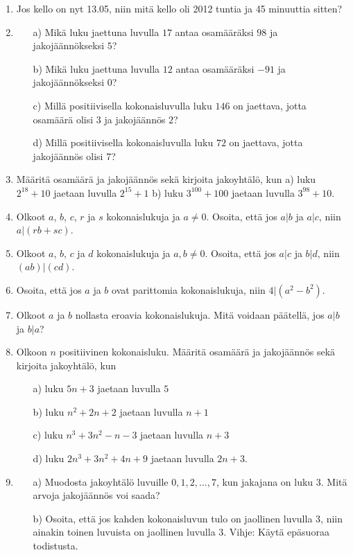 \begin{enumerate}
\item 
Jos kello on nyt 13.05, niin mitä kello oli 2012 tuntia ja 45 minuuttia sitten?

\item 
\begin{itemize}
\item[a)] Mikä luku jaettuna luvulla $17$ antaa osamääräksi $98$ ja jakojäännökseksi $5$?
\item[b)] Mikä luku jaettuna luvulla $12$ antaa osamääräksi $-91$ ja jakojäännökseksi $0$?
\item[c)] Millä positiivisella kokonaisluvulla luku $146$ on jaettava, jotta osamäärä olisi $3$ ja jakojäännös $2$?
\item[d)] Millä positiivisella kokonaisluvulla luku $72$ on jaettava, jotta jakojäännös olisi 7?
\end{itemize}

\item Määritä osamäärä ja jakojäännös sekä kirjoita jakoyhtälö, kun a) luku $2^{18} + 10$ jaetaan luvulla $2^{15} + 1$ b) luku $3^{100} + 100$ jaetaan luvulla $3^{98} + 10$.

\item Olkoot $a$, $b$, $c$, $r$ ja $s$ kokonaislukuja ja $a \neq 0$. Osoita, että jos $a|b$ ja $a|c$, niin $a|(rb + sc)$.

\item Olkoot $a$, $b$, $c$ ja $d$ kokonaislukuja ja $a,b \neq 0$. Osoita, että jos $a|c$ ja $b|d$, niin $(ab)|(cd)$.

\item Osoita, että jos $a$ ja $b$ ovat parittomia kokonaislukuja, niin $4 | (a^2 - b^2)$.

\item Olkoot $a$ ja $b$ nollasta eroavia kokonaislukuja. Mitä voidaan päätellä, jos $a|b$ ja $b|a$?

\item Olkoon $n$ positiivinen kokonaisluku. Määritä osamäärä ja jakojäännös sekä kirjoita jakoyhtälö, kun
\begin{itemize}
\item[a)] luku $5n + 3$ jaetaan luvulla $5$
\item[b)] luku $n^2 + 2n + 2$ jaetaan luvulla $n + 1$
\item[c)] luku $n^3 + 3n^2 - n - 3$ jaetaan luvulla $n + 3$
\item[d)] luku $2n^3 + 3n^2 + 4n + 9$ jaetaan luvulla $2n + 3$.
\end{itemize}

\item
\begin{itemize}
\item[a)] Muodosta jakoyhtälö luvuille $0,1,2,\ldots,7$, kun jakajana on luku $3$. Mitä arvoja jakojäännös voi saada?
\item[b)] Osoita, että jos kahden kokonaisluvun tulo on jaollinen luvulla $3$, niin ainakin toinen luvuista on jaollinen luvulla $3$. Vihje: Käytä epäsuoraa todistusta.
\end{itemize}

\end{enumerate}

